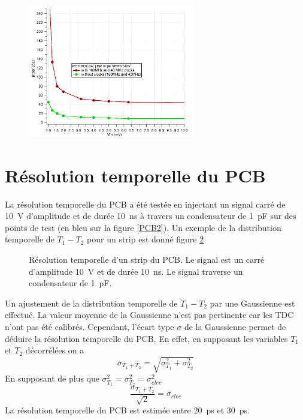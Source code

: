 \begin{figure}[ht!]
	\centering
	\includegraphics[width=0.65\textwidth]{ELE/Jitter.png}
	\label{jitter}
\end{figure}

\vspace{0.4cm}
\section{Résolution temporelle du PCB}
La résolution temporelle du PCB a été testée en injectant un signal carré de \SI{10}{\volt} d'amplitude et de durée \SI{10}{\nano\second} à travers un condensateur de \SI{1}{\pico\farad} sur des points de test (en bleu sur la figure \ref{PCB2}). Un exemple de la distribution temporelle de $T_{1}-T_{2}$ pour un strip est donné figure \ref{RESOLUTION}

\begin{figure}[!ht]
	\centering
	\caption{Résolution temporelle d'un strip du PCB. Le signal est un carré d'amplitude \SI{10}{\volt} et de durée \SI{10}{\nano\second}. Le signal traverse un condensateur de \SI{1}{\pico\farad}.}
	\label{RESOLUTION}
\end{figure}

Un ajustement de la distribution temporelle de $T_{1}-T_{2}$ par une Gaussienne est effectué. La valeur moyenne de la Gaussienne n'est pas pertinente car les TDC n'ont pas été calibrés. Cependant, l'écart type $\sigma$ de la Gaussienne permet de déduire la résolution temporelle du PCB. En effet, en supposant les variables $T_1$ et $T_2$ décorrélées on a
\begin{equation}
\sigma_{T_1+T_2}=\sqrt{\sigma_{T_1}^2+\sigma_{T_2}^2}
\end{equation}
En supposant de plus que $\sigma_{T_1}^2=\sigma_{T_2}^2=\sigma_{elec}^2$
\begin{equation}
\frac{\sigma_{T_1+T_2}}{\sqrt{2}}=\sigma_{elec}
\end{equation}
La résolution temporelle du PCB est estimée entre \SI{20}{\pico\second} et \SI{30}{\pico\second}.


